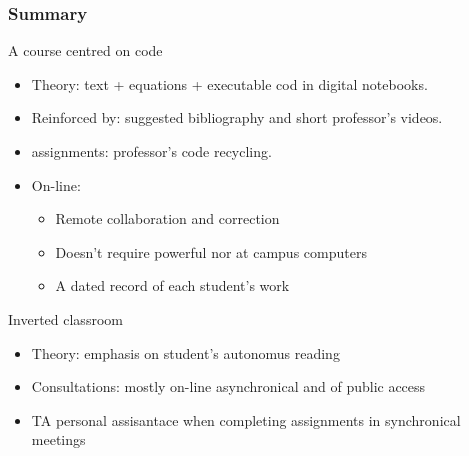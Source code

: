 \documentclass[aspectratio=169]{beamer}
\begin{document}
\begin{frame}
	\frametitle{Summary}
	\begin{block}{A course centred on code}
		\begin{itemize}[<+->]
			\item Theory: text + equations + executable cod in digital notebooks.
			\item Reinforced by: suggested bibliography and short professor's videos.
			\item assignments: professor's code recycling.
			\item On-line:
			\begin{itemize}[<+->]
				\item Remote collaboration and correction
				\item Doesn't require powerful nor at campus computers
				\item A dated record of each student's work
			\end{itemize}
		\end{itemize}
	\end{block}
	\begin{block}{Inverted classroom}
		\begin{itemize}[<+->]
			\item Theory: emphasis on student's autonomus reading
			\item Consultations: mostly on-line asynchronical and of public access
			\item TA personal assisantace when completing assignments in synchronical meetings
		\end{itemize}
	\end{block}
\end{frame}
\end{document}
